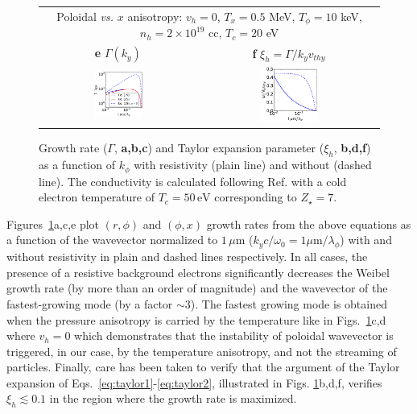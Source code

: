 \documentclass[aps,showpacs,superscriptaddress]{revtex4}
\begin{document}
\begin{figure}[ht]
{\begin{tabular}{cc}
\multicolumn{2}{c}{Poloidal \emph{vs.} $x$  anisotropy: $v_h = 0 $, $T_x=0.5$ MeV, $T_\phi = 10$ keV, $n_h = 2\times 10^{19}$ cc, $T_{c}=20$ eV }\\
\textbf{e} $\Gamma(k_y)$&\textbf{f} $\xi_h= \Gamma/k_yv_{thy}$ \\
\includegraphics[width=0.33\textwidth]{gamma_ky_ordre3_r_phi_2.eps} 
 &\includegraphics[width=0.33\textwidth]{xi_ky_ordre3_r_phi_2.eps} 
\end{tabular}} 
\caption{\label{fig:gamma_ky} 
Growth rate ($\Gamma$, \textbf{a,b,c}) and Taylor expansion parameter ($\xi_h$, \textbf{b,d,f}) as a function of $k_\phi$ with resistivity (plain line) and without (dashed line).
The conductivity is calculated following Ref.  \cite[]{POP_Perez_2012} with a cold electron temperature of $T_c = 50\,\mathrm{eV}$ corresponding to $Z_\star = 7$. 
}
\end{figure}

Figures~\ref{fig:gamma_ky}a,c,e plot $(r, \phi)$ and $(\phi,x)$ growth rates from the above equations as a function of the wavevector normalized to $1\, \mu$m ($k_yc/\omega_0 = 1\mu\mathrm{m}/\lambda_\phi$) with and without resistivity in plain and dashed lines respectively. 
In all cases, the presence of a resistive background electrons significantly decreases the Weibel growth rate (by more than an order of magnitude) and the wavevector of the fastest-growing mode (by a factor $\sim 3$). 
The fastest growing mode is obtained when the pressure anisotropy is carried by the temperature like in Figs.~\ref{fig:gamma_ky}c,d  where $v_h = 0$ which demonstrates that the instability of poloidal wavevector is triggered, in our case, by the temperature anisotropy, and not the streaming of particles.
Finally, care has been taken to verify that the argument of the Taylor expansion of Eqs.~\eqref{eq:taylor1}-\eqref{eq:taylor2}, illustrated in Figs. \ref{fig:gamma_ky}b,d,f,
verifies $\xi_h \lesssim 0.1$ in the region where the growth rate is maximized.
\end{document}
